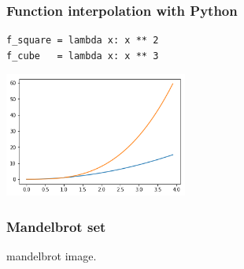 \documentclass[9pt]{beamer}
\begin{document}
\begin{frame}[fragile]
  \frametitle{Function interpolation with Python}

  \begin{center}
    \begin{lstlisting}
f_square = lambda x: x ** 2
f_cube   = lambda x: x ** 3
    \end{lstlisting}
  \end{center}

  \begin{center}
    \includegraphics[width = 6cm]{images/two_functions.png}
  \end{center}

\end{frame}

\begin{frame}
  \frametitle{Mandelbrot set}

  mandelbrot image.

\end{frame}
\end{document}
